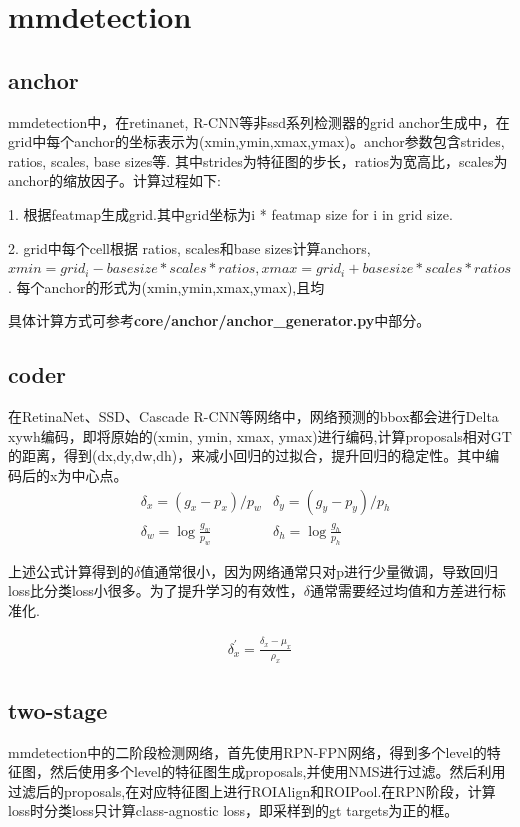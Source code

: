\documentclass{article}
\begin{document}
\section{mmdetection}

\subsection{anchor}
mmdetection中，在retinanet, R-CNN等非ssd系列检测器的grid anchor生成中，在grid中每个anchor的坐标表示为(xmin,ymin,xmax,ymax)。anchor参数包含strides, ratios, scales, base sizes等. 其中strides为特征图的步长，ratios为宽高比，scales为anchor的缩放因子。计算过程如下:

1. 根据featmap生成grid.其中grid坐标为i * featmap size for i in grid size.

2. grid中每个cell根据 ratios,  scales和base sizes计算anchors,$xmin = grid_i -  basesize*scales*ratios, xmax = grid_i +basesize*scales*ratios$.
每个anchor的形式为(xmin,ymin,xmax,ymax),且均

 具体计算方式可参考\textbf{core/anchor/anchor\_generator.py}中部分。

\subsection{coder}
在RetinaNet、SSD、Cascade R-CNN等网络中，网络预测的bbox都会进行Delta xywh编码，即将原始的(xmin, ymin, xmax, ymax)进行编码,计算proposals相对GT的距离，得到(dx,dy,dw,dh)，来减小回归的过拟合，提升回归的稳定性。其中编码后的x为中心点。
\begin{equation}
\begin{aligned}
&\delta_x = (g_x-p_x)/p_w	   & \delta_y = (g_y - p_y)/p_h \\
&\delta_w = \log{\frac{g_w}{p_w}}	&\delta_h = \log{\frac{g_h}{p_h}}
\end{aligned}\label{bbox_coder}
\end{equation}

上述公式计算得到的$\delta$值通常很小，因为网络通常只对p进行少量微调，导致回归loss比分类loss小很多。为了提升学习的有效性，$\delta$通常需要经过均值和方差进行标准化.

\begin{equation}
\begin{aligned}
\delta_{x}^{'}=\frac{\delta_x-\mu_x}{\rho_x}
\end{aligned}
\end{equation}

\subsection{two-stage}
mmdetection中的二阶段检测网络，首先使用RPN-FPN网络，得到多个level的特征图，然后使用多个level的特征图生成proposals,并使用NMS进行过滤。然后利用过滤后的proposals,在对应特征图上进行ROIAlign和ROIPool.在RPN阶段，计算loss时分类loss只计算class-agnostic loss，即采样到的gt targets为正的框。
\end{document}
